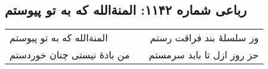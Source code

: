 \begin{center}
\section*{رباعی شماره ۱۱۴۲: المنةالله که به تو پیوستم}
\label{sec:1142}
\begin{longtable}{l p{0.5cm} r}
المنةالله که به تو پیوستم
&&
وز سلسلهٔ بند فراقت رستم
\\
من بادهٔ نیستی چنان خوردستم
&&
حز روز ازل تا بابد سرمستم
\\
\end{longtable}
\end{center}
